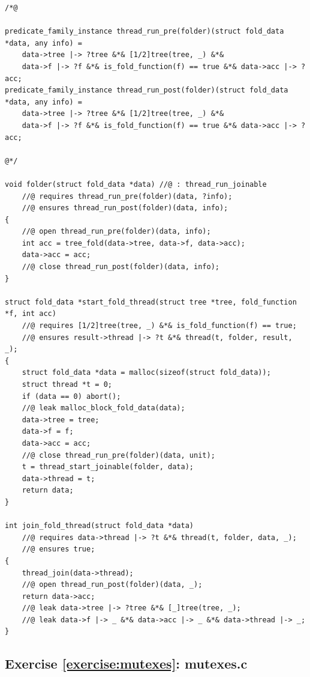 \documentclass{article}
\begin{document}
\begin{lstlisting}
/*@

predicate_family_instance thread_run_pre(folder)(struct fold_data *data, any info) =
    data->tree |-> ?tree &*& [1/2]tree(tree, _) &*&
    data->f |-> ?f &*& is_fold_function(f) == true &*& data->acc |-> ?acc;
predicate_family_instance thread_run_post(folder)(struct fold_data *data, any info) =
    data->tree |-> ?tree &*& [1/2]tree(tree, _) &*&
    data->f |-> ?f &*& is_fold_function(f) == true &*& data->acc |-> ?acc;

@*/

void folder(struct fold_data *data) //@ : thread_run_joinable
    //@ requires thread_run_pre(folder)(data, ?info);
    //@ ensures thread_run_post(folder)(data, info);
{
    //@ open thread_run_pre(folder)(data, info);
    int acc = tree_fold(data->tree, data->f, data->acc);
    data->acc = acc;
    //@ close thread_run_post(folder)(data, info);
}

struct fold_data *start_fold_thread(struct tree *tree, fold_function *f, int acc)
    //@ requires [1/2]tree(tree, _) &*& is_fold_function(f) == true;
    //@ ensures result->thread |-> ?t &*& thread(t, folder, result, _);
{
    struct fold_data *data = malloc(sizeof(struct fold_data));
    struct thread *t = 0;
    if (data == 0) abort();
    //@ leak malloc_block_fold_data(data);
    data->tree = tree;
    data->f = f;
    data->acc = acc;
    //@ close thread_run_pre(folder)(data, unit);
    t = thread_start_joinable(folder, data);
    data->thread = t;
    return data;
}

int join_fold_thread(struct fold_data *data)
    //@ requires data->thread |-> ?t &*& thread(t, folder, data, _);
    //@ ensures true;
{
    thread_join(data->thread);
    //@ open thread_run_post(folder)(data, _);
    return data->acc;
    //@ leak data->tree |-> ?tree &*& [_]tree(tree, _);
    //@ leak data->f |-> _ &*& data->acc |-> _ &*& data->thread |-> _;
}
\end{lstlisting}

\subsection{Exercise \ref{exercise:mutexes}:
mutexes.c}\label{solution:mutexes}
\end{document}
